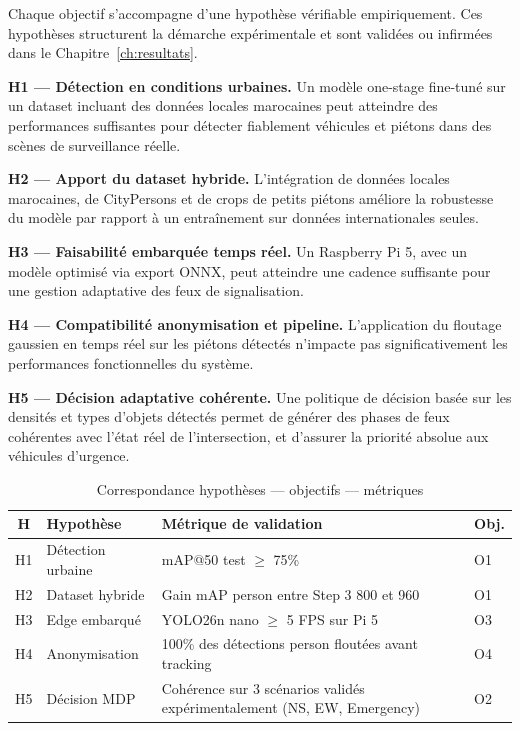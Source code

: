 Chaque objectif s'accompagne d'une hypothèse
vérifiable empiriquement. Ces hypothèses
structurent la démarche expérimentale
et sont validées ou infirmées dans le
Chapitre~\ref{ch:resultats}.

\textbf{H1 — Détection en conditions urbaines.}
Un modèle one-stage fine-tuné sur un dataset
incluant des données locales marocaines peut
atteindre des performances suffisantes pour
détecter fiablement véhicules et piétons
dans des scènes de surveillance réelle.

\textbf{H2 — Apport du dataset hybride.}
L'intégration de données locales marocaines,
de CityPersons et de crops de petits piétons
améliore la robustesse du modèle par rapport
à un entraînement sur données internationales
seules.

\textbf{H3 — Faisabilité embarquée temps réel.}
Un Raspberry Pi 5, avec un modèle optimisé
via export ONNX, peut atteindre une cadence
suffisante pour une gestion adaptative des
feux de signalisation.

\textbf{H4 — Compatibilité anonymisation et pipeline.}
L'application du floutage gaussien en temps
réel sur les piétons détectés n'impacte pas
significativement les performances fonctionnelles
du système.

\textbf{H5 — Décision adaptative cohérente.}
Une politique de décision basée sur les
densités et types d'objets détectés permet
de générer des phases de feux cohérentes
avec l'état réel de l'intersection, et
d'assurer la priorité absolue aux véhicules
d'urgence.

\begin{table}[H]
\centering
\caption{Correspondance hypothèses — objectifs — métriques}
\begin{tabularx}{\textwidth}{clXl}
\toprule
\textbf{H} & \textbf{Hypothèse} &
\textbf{Métrique de validation} &
\textbf{Obj.} \\
\midrule
H1 & Détection urbaine &
mAP@50 test $\geq$ 75\% & O1 \\
H2 & Dataset hybride &
Gain mAP person entre Step 3 800 et 960 & O1 \\
H3 & Edge embarqué &
YOLO26n nano $\geq$ 5 FPS sur Pi 5 & O3 \\
H4 & Anonymisation &
100\% des détections person floutées avant tracking & O4 \\
H5 & Décision MDP &
Cohérence sur 3 scénarios validés
expérimentalement (NS, EW, Emergency) & O2 \\
\bottomrule
\end{tabularx}
\label{tab:hypotheses}
\end{table}

